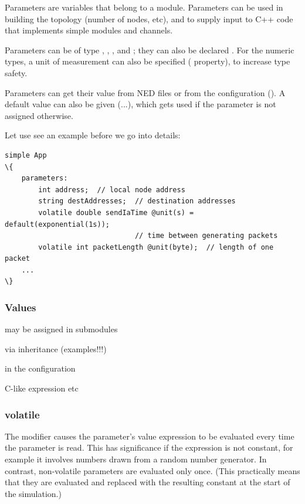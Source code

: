 Parameters are variables that belong to a module. Parameters can be
used in building the topology (number of nodes, etc), and to supply
input to C++ code that implements simple modules and channels.

Parameters can be of type , ,
,  and ; they can also
be declared . For the numeric types, a unit of
measurement can also be specified ( property), to increase
type safety.

Parameters can get their value from NED files or from the configuration
(). A default value can also be given (...\ttt{)}),
which gets used if the parameter is not assigned otherwise.

Let use see an example before we go into details:

\begin{Verbatim}[commandchars=\\\{\}]
simple App
\{
    parameters:
        int address;  // local node address
        string destAddresses;  // destination addresses
        volatile double sendIaTime @unit(s) = default(exponential(1s));
                               // time between generating packets
        volatile int packetLength @unit(byte);  // length of one packet
    ...
\}
\end{Verbatim}

\subsubsection{Values}

may be assigned in submodules

via inheritance  (examples!!!)

in the configuration

C-like expression etc

\subsubsection{volatile}

The  modifier causes the parameter's value expression to
be evaluated every time the parameter is read. This has significance if the
expression is not constant, for example it involves numbers drawn from a
random number generator. In contrast, non-volatile parameters are evaluated
only once. (This practically means that they are evaluated and replaced
with the resulting constant at the start of the simulation.)

